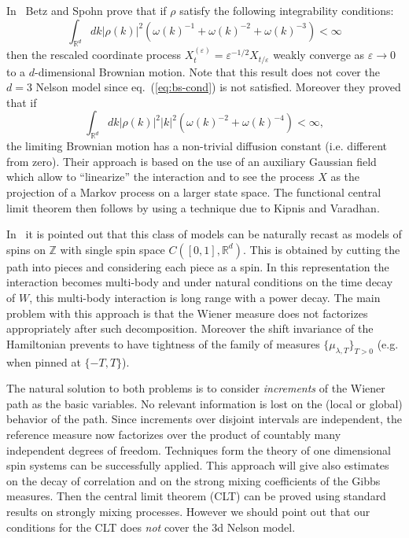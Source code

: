 \documentclass[a4paper,12pt,reqno]{amsart}
\newcommand{\eps}{\varepsilon}
\newcommand{\R}{\mathbb{R}}
\newcommand{\Z}{\mathbb{Z}}
\begin{document}
In~\cite{BS03} Betz and Spohn prove that if $\rho$ satisfy the following integrability conditions:
\begin{equation}
  \label{eq:bs-cond}
\int_{\R^d} dk |\rho(k)|^2 
 \left( \omega(k)^{-1} + \omega(k)^{-2} + \omega(k)^{-3}\right) < \infty  
\end{equation}
then
 the rescaled coordinate process $X^{(\eps)}_t =
\eps^{-1/2} X_{t/\eps}$ weakly converge as $\eps\to 0$ to a
$d$-dimensional Brownian motion. Note that this result does not cover the $d=3$ Nelson model since eq.~(\ref{eq:bs-cond}) is not satisfied. Moreover they proved that if
$$
\int_{\R^d} dk |\rho(k)|^2 |k|^2
 \left(  \omega(k)^{-2} + \omega(k)^{-4}\right) < \infty,
$$
the limiting Brownian motion has a non-trivial diffusion constant (i.e. different from zero). Their approach is based on the use of
an auxiliary Gaussian field which allow to ``linearize'' the
interaction and to see the process $X$ as the projection of a Markov
process on a larger state space. The functional central limit theorem
 then follows by using a technique due to  Kipnis and Varadhan.

In~\cite{Spohn87} it is pointed out that this class of
models can be naturally recast as models of spins on $\Z$ with single
spin space $C([0,1],\R^d)$. This is obtained by cutting the path into
pieces and considering each piece as a spin. In this
representation the interaction becomes multi-body and under natural
conditions on the time decay of $W$, this multi-body interaction is
long range with a power decay. The main problem with this approach is that the Wiener measure does not factorizes appropriately after such decomposition.
Moreover the shift invariance of the Hamiltonian prevents to have tightness of
the family of measures $\{\mu_{\lambda,T}\}_{T > 0}$ (e.g. when pinned at $\{-T,T\}$). 

The natural solution to both problems
 is 
to consider \emph{increments} of the Wiener path as the basic
variables. No relevant information is lost on the (local
or global) behavior  of the path.  Since increments over disjoint intervals are independent, the reference measure now  factorizes over the product of countably many independent degrees of freedom. Techniques form the theory of one
dimensional spin systems can be successfully applied. This approach  will give also estimates
on the decay of correlation and on the strong mixing coefficients of the Gibbs measures. 
Then the central limit theorem (CLT)
can be proved using standard results on strongly mixing processes.
However we should point out that our conditions for the CLT does \emph{not} cover the 3d Nelson model.
\end{document}
